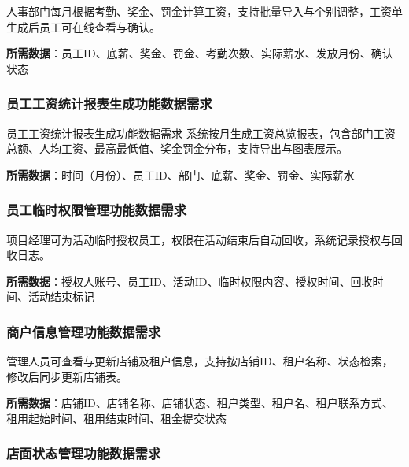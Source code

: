 \documentclass[]{article}
\begin{document}
人事部门每月根据考勤、奖金、罚金计算工资，支持批量导入与个别调整，工资单生成后员工可在线查看与确认。

\textbf{所需数据}：员工ID、底薪、奖金、罚金、考勤次数、实际薪水、发放月份、确认状态

\hypertarget{ux5458ux5de5ux5de5ux8d44ux7edfux8ba1ux62a5ux8868ux751fux6210ux529fux80fdux6570ux636eux9700ux6c42}{%
  \subsubsection{员工工资统计报表生成功能数据需求}\label{ux5458ux5de5ux5de5ux8d44ux7edfux8ba1ux62a5ux8868ux751fux6210ux529fux80fdux6570ux636eux9700ux6c42}}

员工工资统计报表生成功能数据需求
系统按月生成工资总览报表，包含部门工资总额、人均工资、最高最低值、奖金罚金分布，支持导出与图表展示。

\textbf{所需数据}：时间（月份）、员工ID、部门、底薪、奖金、罚金、实际薪水

\hypertarget{ux5458ux5de5ux4e34ux65f6ux6743ux9650ux7ba1ux7406ux529fux80fdux6570ux636eux9700ux6c42}{%
  \subsubsection{员工临时权限管理功能数据需求}\label{ux5458ux5de5ux4e34ux65f6ux6743ux9650ux7ba1ux7406ux529fux80fdux6570ux636eux9700ux6c42}}

项目经理可为活动临时授权员工，权限在活动结束后自动回收，系统记录授权与回收日志。

\textbf{所需数据}：授权人账号、员工ID、活动ID、临时权限内容、授权时间、回收时间、活动结束标记

\hypertarget{ux5546ux6237ux4fe1ux606fux7ba1ux7406ux529fux80fdux6570ux636eux9700ux6c42}{%
  \subsubsection{商户信息管理功能数据需求}\label{ux5546ux6237ux4fe1ux606fux7ba1ux7406ux529fux80fdux6570ux636eux9700ux6c42}}

管理人员可查看与更新店铺及租户信息，支持按店铺ID、租户名称、状态检索，修改后同步更新店铺表。

\textbf{所需数据}：店铺ID、店铺名称、店铺状态、租户类型、租户名、租户联系方式、租用起始时间、租用结束时间、租金提交状态

\hypertarget{ux5e97ux9762ux72b6ux6001ux7ba1ux7406ux529fux80fdux6570ux636eux9700ux6c42}{%
  \subsubsection{店面状态管理功能数据需求}\label{ux5e97ux9762ux72b6ux6001ux7ba1ux7406ux529fux80fdux6570ux636eux9700ux6c42}}
\end{document}
